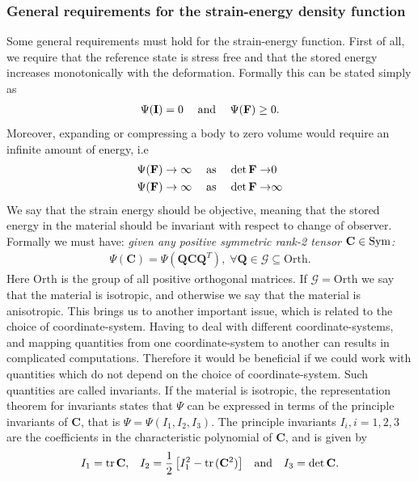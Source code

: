 \subsubsection{General requirements for the strain-energy density
  function}
\label{sec:strain_energy_req}
Some general requirements must hold for the strain-energy function.
First of all, we require that the reference state is stress free and
that the stored energy increases monotonically with the deformation. 
Formally this can be stated simply as 
\begin{align*}
  \Psi(\mathbf{I}) = 0 \; && \text{and} &&\; \Psi(\mathbf{F}) \geq 0.
\end{align*}
Moreover, expanding or compressing a body to zero volume would
require an infinite amount of energy, i.e
\begin{align*}
  \Psi(\mathbf{F}) \rightarrow \infty \; && \text{as} &&\; \det \mathbf{F} \rightarrow& 0 \\
  \Psi(\mathbf{F}) \rightarrow \infty \; && \text{as} &&\; \det \mathbf{F} \rightarrow& \infty
\end{align*}
We say that the strain energy should be objective, meaning that the
stored energy in the material should be invariant with respect to
change of observer. Formally we must have: \emph{given any positive symmetric
rank-2 tensor $\mathbf{C} \in \mathrm{Sym}$:}
\begin{align}
  \Psi(\mathbf{C}) = \Psi(\mathbf{Q}\mathbf{C}\mathbf{Q}^T), \; \forall \mathbf{Q} \in \mathcal{G} \subseteq \mathrm{Orth}.
\end{align}
Here $\mathrm{Orth}$ is the group of all positive orthogonal matrices.
If $\mathcal{G} = \mathrm{Orth}$ we say that the material is
isotropic, and otherwise we say that the material is anisotropic.
This brings us to another important issue, which is related to the
choice of coordinate-system. Having to deal with different
coordinate-systems, and mapping quantities from one coordinate-system
to another can results in complicated computations. Therefore it would be beneficial if we
could work with quantities which do not depend on the choice of
coordinate-system. Such quantities are called invariants. 
If the material is isotropic, the representation theorem for
invariants states that $\Psi$ can be expressed in terms of the
principle invariants of $\mathbf{C}$, that is $\Psi = \Psi(I_1, I_2,
I_3)$. The principle invariants $I_i, i=1,2,3$ are the coefficients in
the characteristic polynomial of $\mathbf{C}$, and is given by 
\begin{align}
  I_1 = \mathrm{tr} \hspace{0.05cm} \mathbf{C},  && I_2 = \frac{1}{2}\left[ I_1^2 - \mathrm{tr} \hspace{0.05cm}(\mathbf{C}^2)\right] && \text{and} && I_3 = \det \mathbf{C}.
\end{align}
